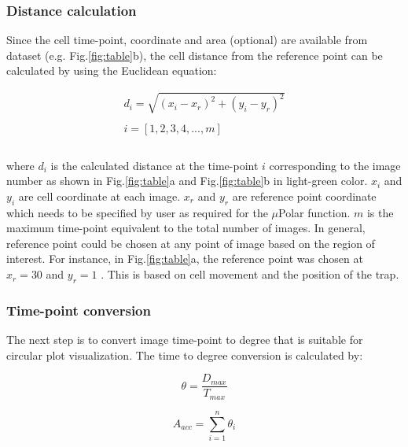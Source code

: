 \documentclass[conference]{IEEEtran}
\begin{document}
\subsubsection{Distance calculation}
Since the cell time-point, coordinate and area (optional) are available from dataset (e.g. Fig.\ref{fig:table}b), the cell distance from the reference point  can be calculated by using the Euclidean equation:

\begin{equation}
\begin{split}
d_i = \sqrt{(x_i - x_r)^2 + (y_i - y_r)^2}\\
\\
i =  [1,2,3,4,..., m ] \\
\\
\end{split}
\end{equation}

where $ d_i $ is the calculated distance at the time-point $ i $ corresponding to the image number as shown in Fig.\ref{fig:table}a and Fig.\ref{fig:table}b in light-green color. $ x_i $ and $ y_i $ are cell coordinate at each image. $ x_r $ and $ y_r $ are reference point coordinate which needs to be specified by user as required for the $\mu$Polar function. $ m $ is the maximum time-point equivalent to the total number of images. In general, reference point could be chosen at any point of image based on the region of interest. For instance, in Fig.\ref{fig:table}a, the reference point was chosen at $x_r = 30$ and $y_r = 1$ . This is based on cell movement and the position of the trap. 
\\

\subsubsection{Time-point conversion}
The next step is to convert  image time-point  to degree that is suitable for circular plot visualization. The time to degree conversion is calculated by: 

\begin{equation}
\theta = \frac{D_{max}} {T_{max}}
\end{equation}

\begin{equation}
A_{acc} = \sum_{i=1}^{n}{\theta_i}
\end{equation}
\end{document}
